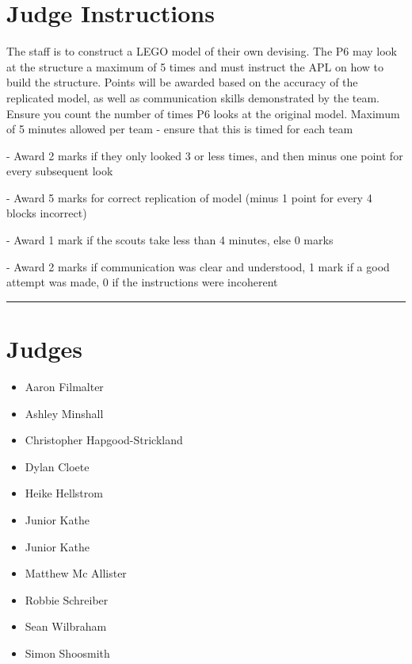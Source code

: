 \documentclass[10pt]{article}
\begin{document}
		\section*{Judge Instructions}
		The staff is to construct a LEGO model of their own devising. The P6 may look at the structure a maximum of 5 times and must instruct the APL on how to build the structure. Points will be awarded based on the accuracy of the replicated model, as well as communication skills demonstrated by the team. Ensure you count the number of times P6 looks at the original model. Maximum of 5 minutes allowed per team - ensure that this is timed for each team



- Award 2 marks if they only looked 3 or less times, and then minus one point for every subsequent look

- Award 5 marks for correct replication of model (minus 1 point for every 4 blocks incorrect)

- Award 1 mark if the scouts take less than 4 minutes, else 0 marks

- Award 2 marks if communication was clear and understood, 1 mark if a good attempt was made, 0 if the instructions were incoherent
\vspace{0.5cm}
	\hrule
	\vspace{0.5cm}
		\section*{\faUsers \: Judges}

		

	\begin{multicols}{2}

		\begin{itemize}
									\item Aaron Filmalter
									\item Ashley Minshall
									\item Christopher Hapgood-Strickland
									\item Dylan Cloete
									\item Heike Hellstrom
									\item Junior Kathe
						\end{itemize}

		\vfill\null
		\columnbreak

		\begin{itemize}
									\item Junior Kathe
									\item Matthew Mc Allister
									\item Robbie Schreiber
									\item Sean Wilbraham
									\item Simon Shoosmith
						\end{itemize}

		\vfill\null

		\end{multicols}
\end{document}
